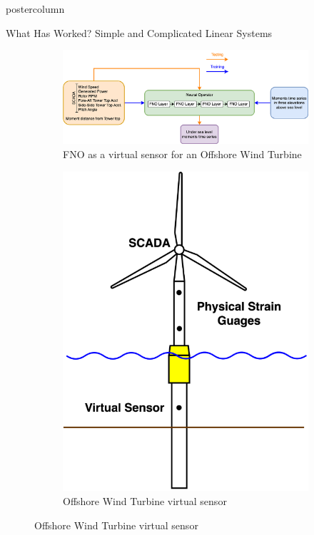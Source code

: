 \documentclass[mathserif]{beamer}
\begin{document}
\begin{frame}
\begin{columns}
\begin{beamercolorbox}[center,wd=\textwidth]{postercolumn}
\begin{minipage}[T]{.95\linewidth}
{\begin{block}{What Has Worked? Simple and Complicated Linear Systems}
\begin{figure}
     \centering
     \begin{subfigure}[t]{0.65\linewidth}
        \centering
    \includegraphics[width=1\linewidth]{figures/WESC2025_Abstract-Page-3.png}
    \caption{FNO as a virtual sensor for an Offshore Wind Turbine}
     \end{subfigure}
     \hfill
     \begin{subfigure}[t]{0.34\linewidth}
         \centering
         \includegraphics[width=0.8\linewidth]{figures/MassCEC.png}
         \caption{Offshore Wind Turbine virtual sensor}
     \end{subfigure}
\end{figure}




\end{block}}
\end{minipage}
\end{beamercolorbox}
\end{columns}
\end{frame}
\end{document}
